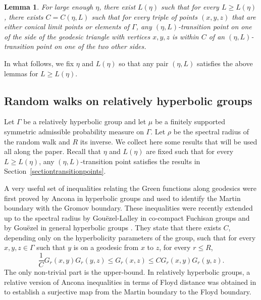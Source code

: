 \documentclass{amsart}
\newtheorem{lem}[thm]{Lemma}
\theoremstyle{definition}
\newtheorem{defn}[thm]{Definition}
\theoremstyle{remark}
\begin{document}





\begin{lem}\label{ThinTransitional2}
For large enough $\eta$, there exist $L(\eta)$ such that for every $L\geq L(\eta)$, there exists $C=C(\eta,L)$ such that for every triple of points $(x,y,z)$ that are either conical limit points or elements of $\Gamma$, any $(\eta,L)$-transition point on one of the side of the geodesic triangle with vertices $x,y,z$ is within $C$ of an $(\eta,L)$-transition point on one of the two other sides.
\end{lem}
In what follows, we fix $\eta$ and $L(\eta)$ so that any pair $(\eta,L)$ satisfies the above lemmas for $L\geq L(\eta)$.










\subsection{Random walks on relatively hyperbolic groups}
Let $\Gamma$ be a relatively hyperbolic group and let $\mu$ be a finitely supported symmetric admissible probability measure on $\Gamma$.
Let $\rho$ be the spectral radius of the random walk and $R$ its inverse.
We collect here some results that will be used all along the paper.
Recall that $\eta$ and $L(\eta)$ are fixed such that for every $L\geq L(\eta)$, any $(\eta,L)$-transition point satisfies the results in Section~\ref{sectiontransitionpoints}.


A very useful set of inequalities relating the Green functions along geodesics were first proved   by Ancona \cite{Ancona} in hyperbolic groups and used to  identify  the Martin boundary   with the Gromov boundary.
These inequalities were recently extended up to the spectral radius by Gou\"ezel-Lalley in co-compact Fuchisan groups \cite{GouezelLalley} and by Gou\"ezel in general hyperbolic groups \cite{Gouezel}.
They state that there exists $C$, depending only on the hyperbolicity parameters of the group, such that for every $x,y,z\in \Gamma$ such that $y$ is on a geodesic from $x$ to $z$, for every $r\leq R$,
$$\frac{1}{C}G_r(x,y)G_r(y,z)\leq G_r(x,z)\leq C G_r(x,y)G_r(y,z).$$
The only non-trivial part is the upper-bound.
In relatively hyperbolic groups, a relative version of Ancona inequalities in terms of Floyd distance was obtained in \cite{GGPY} to establish a surjective map from the Martin boundary to the Floyd boundary.
\end{document}
